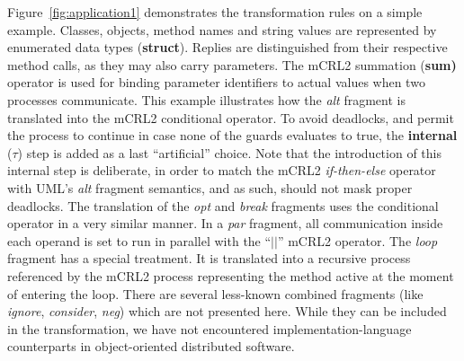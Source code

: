 \documentclass[letter]{llncs}
\begin{document}
Figure~\ref{fig:application1} demonstrates the transformation rules on a simple example. 
Classes, objects, method names and string values
are represented by enumerated data types (\textbf{struct}). 
Replies are distinguished from their respective method calls, as they may also carry
parameters. The mCRL2 summation (\textbf{sum)} operator is used for binding parameter identifiers to actual values when two processes communicate. 
This example illustrates how the \emph{alt} fragment is translated into the mCRL2 conditional operator. To avoid deadlocks, and permit the process
to continue in case none of the guards evaluates to true, the \textbf{internal} (${\tau}$) step is added as a last ``artificial'' choice. 
Note that the introduction of this internal step is deliberate, in order to match the mCRL2 \emph{if-then-else} operator with 
UML's \emph{alt} fragment semantics, and as such, should not mask proper deadlocks.
The translation
of the \textit{opt} and \textit{break} fragments uses the conditional operator in a very similar manner. In a \textit{par} fragment,
all communication inside each operand is set to run in parallel with the  ``${||}$'' mCRL2 operator.
The \textit{loop} fragment has a special treatment. It is translated into a recursive process referenced by the mCRL2 process representing
the method active at the moment of entering the loop.
There are several less-known combined fragments (like \emph{ignore}, \emph{consider}, \emph{neg}) which are not presented here. 
While they can be included in the transformation, we have not encountered implementation-language counterparts in
object-oriented distributed software.
\end{document}

